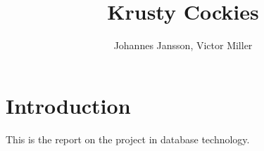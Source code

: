 \documentclass[a4paper]{scrartcl}
\numberwithin{equation}{section}
\begin{document}
\title{Krusty Cockies}
\author{Johannes Jansson, Victor Miller}



\maketitle

\section*{Introduction}

This is the report on the project in database technology.

% 






    

\end{document}
